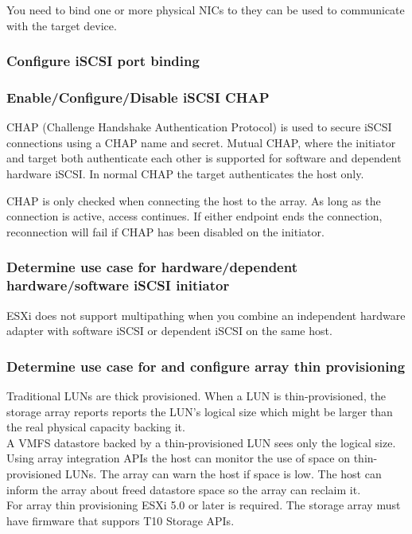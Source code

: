 You need to bind one or more physical NICs to they can be used to communicate
with the target device.\\

\subsubsection{Configure iSCSI port binding}

\subsubsection{Enable/Configure/Disable iSCSI CHAP}

CHAP (Challenge Handshake Authentication Protocol) is used to secure iSCSI
connections using a CHAP name and secret. Mutual CHAP, where the initiator and
target both authenticate each other is supported for software and dependent
hardware iSCSI. In normal CHAP the target authenticates the host only.

CHAP is only checked when connecting the host to the array. As long as the
connection is active, access continues. If either endpoint ends the
connection, reconnection will fail if CHAP has been disabled on the initiator.

\subsubsection{Determine use case for hardware/dependent hardware/software iSCSI initiator}

ESXi does not support multipathing when you combine an independent hardware
adapter with software iSCSI or dependent iSCSI on the same host.

\subsubsection{Determine use case for and configure array thin provisioning}

Traditional LUNs are thick provisioned. When a LUN is thin-provisioned, the
storage array reports reports the LUN's logical size which might be larger
than the real physical capacity backing it.\\

A VMFS datastore backed by a thin-provisioned LUN sees only the logical
size.\\

Using array integration APIs the host can monitor the use of space on
thin-provisioned LUNs. The array can warn the host if space is low. The
host can inform the array about freed datastore space so the array can reclaim
it.\\

For array thin provisioning ESXi 5.0 or later is required. The storage array
must have firmware that suppors T10 Storage APIs.
